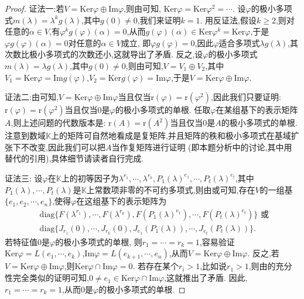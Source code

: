 \documentclass[../../main.tex]{subfiles}%
\begin{document}
\begin{proof}

{\color{blue}证法一:}若$V=\mathrm{Ker}\varphi\oplus\mathrm{Im}\varphi$,则由可知, $\mathrm{Ker}\varphi=\mathrm{Ker}\varphi^2=\cdots$. 设$\varphi$的极小多项式$m(\lambda)=\lambda^kg(\lambda)$,其中$g(0)\neq 0$,我们来证明$k = 1$. 用反证法,假设$k\geqslant 2$,则对任意的$\alpha\in V$,有$\varphi^kg(\varphi)(\alpha)=0$,从而$g(\varphi)(\alpha)\in\mathrm{Ker}\varphi^k=\mathrm{Ker}\varphi$,于是$\varphi g(\varphi)(\alpha)=0$对任意的$\alpha\in V$成立, 即$\varphi g(\varphi)=0$,因此$\varphi$适合多项式$\lambda g(\lambda)$,其次数比极小多项式的次数还小,这就导出了矛盾. 反之,设$\varphi$的极小多项式$m(\lambda)=\lambda g(\lambda)$,其中$g(0)\neq 0$,则由可知,$V = V_1\oplus V_2$,其中$V_1=\mathrm{Ker}\varphi=\mathrm{Im}g(\varphi)$,$V_2=\mathrm{Ker}g(\varphi)=\mathrm{Im}\varphi$,于是$V=\mathrm{Ker}\varphi\oplus\mathrm{Im}\varphi$.

{\color{blue}证法二:}由可知,$V=\mathrm{Ker}\varphi\oplus\mathrm{Im}\varphi$当且仅当$\mathrm{r}(\varphi)=\mathrm{r}(\varphi^2)$,因此我们只要证明: $\mathrm{r}(\varphi)=\mathrm{r}(\varphi^2)$当且仅当$0$是$\varphi$的极小多项式的单根. 任取$\varphi$在某组基下的表示矩阵$A$,则上述问题的代数版本是: $\mathrm{r}(A)=\mathrm{r}(A^2)$当且仅当$0$是$A$的极小多项式的单根. 注意到数域$\mathbb{K}$上的矩阵可自然地看成是复矩阵,并且矩阵的秩和极小多项式在基域扩张下不改变,因此我们可以把$A$当作复矩阵进行证明 (即本题分析中的讨论,其中用替代的引用),具体细节请读者自行完成.

{\color{blue}证法三:}
设$\varphi$在$\mathbb{K}$上的初等因子为$\lambda^{r_1},\cdots,\lambda^{r_k},P_1(\lambda)^{e_1},\cdots,P_t(\lambda)^{e_t}$,其中$P_1(\lambda),\cdots,P_t(\lambda)$是$\mathbb{K}$上常数项非零的不可约多项式,则由或可知,存在$V$的一组基$\{e_1,e_2,\cdots,e_n\}$,使得$\varphi$在这组基下的表示矩阵为
\begin{align*}
&\mathrm{diag}\{F(\lambda^{r_1}),\cdots,F(\lambda^{r_k}),F(P_1(\lambda)^{e_1}),\cdots,F(P_t(\lambda)^{e_t})\}\text{ 或 }\\
&\mathrm{diag}\{J_{r_1}(0),\cdots,J_{r_k}(0),J_{e_1}(P_1(\lambda)),\cdots,J_{e_t}(P_t(\lambda))\}.
\end{align*}
若特征值$0$是$\varphi$的极小多项式的单根, 则$r_1 = \cdots = r_k = 1$,容易验证$\mathrm{Ker}\varphi = L(e_1,\cdots,e_k)$,$\mathrm{Im}\varphi = L(e_{k + 1},\cdots,e_n)$,从而$V = \mathrm{Ker}\varphi\oplus\mathrm{Im}\varphi$. 反之,若$V = \mathrm{Ker}\varphi\oplus\mathrm{Im}\varphi$,则$\mathrm{Ker}\varphi\cap\mathrm{Im}\varphi = 0$. 若存在某个$r_i > 1$,比如说$r_1 > 1$,则由的充分性完全类似的证明可知,$0\neq e_1\in\mathrm{Ker}\varphi\cap\mathrm{Im}\varphi$,这就推出了矛盾. 因此,$r_1 = \cdots = r_k = 1$,从而$0$是$\varphi$的极小多项式的单根. 

\end{proof}
\end{document}
